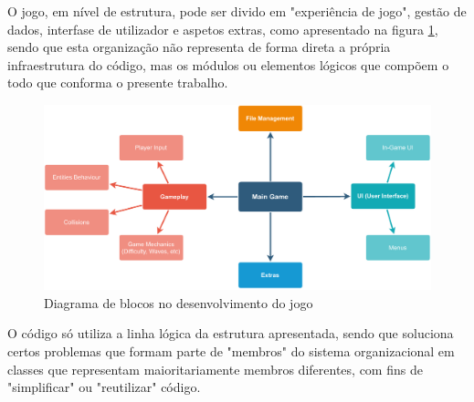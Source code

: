 \documentclass[a4paper,11pt]{article}
\begin{document}
          
   
       
     
            
              
         
            
         
        
        
   
    
	
    

    









\begin{tabbing}
    
\end{tabbing}
O jogo, em nível de estrutura, pode ser divido em "experiência de jogo", gestão de dados, interfase de utilizador e aspetos extras, como apresentado na figura \ref{fig:GameModulesDiagram}, sendo que esta organização não representa de forma direta a própria infraestrutura do código, mas os módulos ou elementos lógicos que compõem o todo que conforma o presente trabalho.

\vspace{8pt}

\begin{figure}[!ht]
    \centering
    \includegraphics[scale = 0.60]{2 - Esquemas/GameModulesDiagram.pdf}
    \caption{Diagrama de blocos no desenvolvimento do jogo}
    \label{fig:GameModulesDiagram}
\end{figure}

\vspace{8pt}

O código só utiliza a linha lógica da estrutura apresentada, sendo que soluciona certos problemas que formam parte de "membros" do sistema organizacional em classes que representam maioritariamente membros diferentes, com fins de "simplificar" ou "reutilizar" código.
\end{document}
